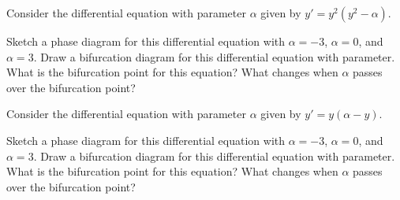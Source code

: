 \documentclass{ximera}
\begin{document}
\begin{exercise}
    Consider the differential equation with parameter $\alpha$ given by $y' = y^2(y^2 - \alpha)$. 
    \begin{tasks}
        \task Sketch a phase diagram for this differential equation with $\alpha = -3$, $\alpha = 0$, and $\alpha = 3$. 
        \task Draw a bifurcation diagram for this differential equation with parameter. 
        \task What is the bifurcation point for this equation? What changes when $\alpha$ passes over the bifurcation point?
    \end{tasks}
\end{exercise}

\begin{exercise}
    Consider the differential equation with parameter $\alpha$ given by $y' = y(\alpha - y)$. 
    \begin{tasks}
        \task Sketch a phase diagram for this differential equation with $\alpha = -3$, $\alpha = 0$, and $\alpha = 3$. 
        \task Draw a bifurcation diagram for this differential equation with parameter. 
        \task What is the bifurcation point for this equation? What changes when $\alpha$ passes over the bifurcation point?
    \end{tasks}
\end{exercise}
\end{document}
